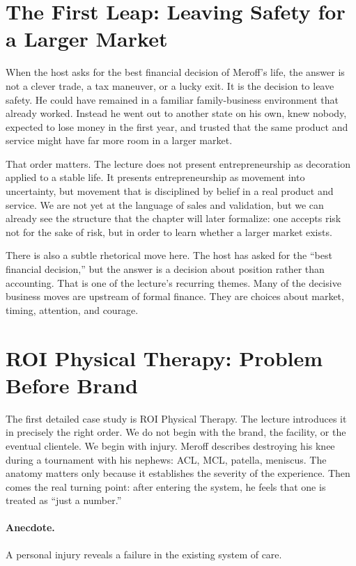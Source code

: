 \section{The First Leap: Leaving Safety for a Larger Market}

When the host asks for the best financial decision of Meroff's life, the answer is not a clever trade, a tax maneuver, or a lucky exit. It is the decision to leave safety. He could have remained in a familiar family-business environment that already worked. Instead he went out to another state on his own, knew nobody, expected to lose money in the first year, and trusted that the same product and service might have far more room in a larger market.

That order matters. The lecture does not present entrepreneurship as decoration applied to a stable life. It presents entrepreneurship as movement into uncertainty, but movement that is disciplined by belief in a real product and service. We are not yet at the language of sales and validation, but we can already see the structure that the chapter will later formalize: one accepts risk not for the sake of risk, but in order to learn whether a larger market exists.

There is also a subtle rhetorical move here. The host has asked for the ``best financial decision,'' but the answer is a decision about position rather than accounting. That is one of the lecture's recurring themes. Many of the decisive business moves are upstream of formal finance. They are choices about market, timing, attention, and courage.

\section{ROI Physical Therapy: Problem Before Brand}

The first detailed case study is ROI Physical Therapy. The lecture introduces it in precisely the right order. We do not begin with the brand, the facility, or the eventual clientele. We begin with injury. Meroff describes destroying his knee during a tournament with his nephews: ACL, MCL, patella, meniscus. The anatomy matters only because it establishes the severity of the experience. Then comes the real turning point: after entering the system, he feels that one is treated as ``just a number.''

\paragraph{Anecdote.}
A personal injury reveals a failure in the existing system of care.

